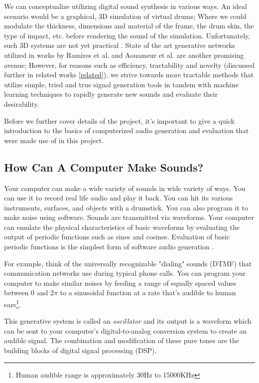 \documentclass[\main/thesis.tex]{subfiles}
\begin{document}
We can conceptualize utilizing digital sound synthesis in various ways. An ideal scenario would be a graphical, 3D simulation of virtual drums; Where we could modulate the thickness, dimensions and material of the frame, the drum skin, the type of impact, etc. before rendering the sound of the simulation. Unfortunately, such 3D systems are not yet practical \cite{langlois2016toward}. State of the art generative networks utilized in works by Ramires et al. \cite{ramires2019timbfeat} and Aouameur et al.\cite{aouameur2019neural} 
are another promising avenue; However, for reasons such as efficiency, tractability and novelty (discussed further in related works \ref{related}), we strive towards more tractable methods that utilize simple, tried and true signal generation tools in tandem with machine learning techniques to rapidly generate new sounds and evaluate their desirability.

Before we further cover details of the project, it's important to give a quick introduction to the basics of computerized audio generation and evaluation that were made use of in this project.
\subsection{How Can A Computer Make Sounds?}

Your computer can make a wide variety of sounds in wide variety of ways. You can use it to record real life audio and play it back. You can hit its various instruments, surfaces, and objects with a drumstick. You can also program it to make noise using software.
Sounds are transmitted via waveforms. Your computer can emulate the physical characteristics of basic waveforms by evaluating the output of periodic functions such as sines and cosines. Evaluation of basic periodic functions is the simplest form of software audio generation \cite[chapter~5]{mitchell2009basicsynth}.

For example, think of the universally recognizable "dialing" sounds (DTMF) that communication networks use during typical phone calls. You can program your computer to make similar noises by feeding a range of equally spaced values between 0 and $2\pi$ to a sinusoidal function at a rate that's audible to human ears\footnote{Human audible range is approximately 30Hz to 15000KHz}. 

This generative system is called an \textit{oscillator} and its output is a waveform which can be sent to your computer's digital-to-analog conversion system to create an audible signal. The combination and modification of these pure tones are the building blocks of digital signal processing (DSP).
\end{document}
